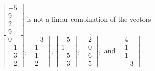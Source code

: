 \begin{exercise}
\begin{exerciseStatement}
  \end{exerciseStatement}
  \begin{exerciseAnswer}
   \(\left[\begin{array}{c}
-5 \\
9 \\
2 \\
9
\end{array}\right]\) 
  	 is not  
	a linear combination of the vectors \(\left[\begin{array}{c}
0 \\
-1 \\
-3 \\
-2
\end{array}\right] , \left[\begin{array}{c}
-3 \\
1 \\
1 \\
2
\end{array}\right] , \left[\begin{array}{c}
-5 \\
1 \\
-5 \\
-3
\end{array}\right] , \left[\begin{array}{c}
2 \\
0 \\
6 \\
5
\end{array}\right] , \text{ and } \left[\begin{array}{c}
4 \\
1 \\
1 \\
-3
\end{array}\right]\).

	
  


  \end{exerciseAnswer}
\end{exercise}